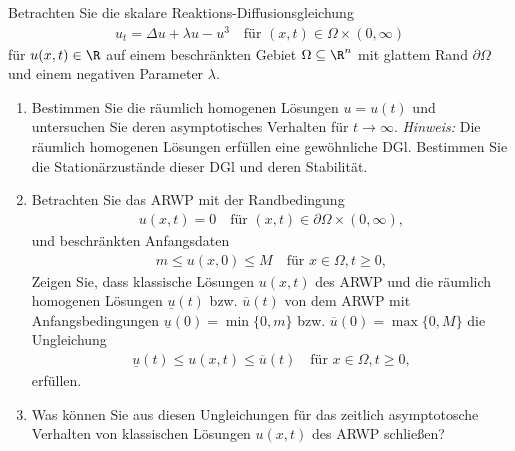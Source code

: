 
\begin{exercise}

\phantom{}
	Betrachten Sie die skalare Reaktions-Diffusionsgleichung
	\begin{align*}
		u_t = \Delta u + \lambda u - u^3 \quad \text{für } (x,t) \in \Omega \times (0, \infty)
	\end{align*}
	für $u(x,t) \in \R$ auf einem beschränkten Gebiet $\Omega \subseteq \R^n$ mit glattem Rand $\partial \Omega$ und einem negativen Parameter $\lambda$. 
	\begin{enumerate}[label = (\roman*)]
		\item Bestimmen Sie die räumlich homogenen Lösungen $u = u(t)$ und untersuchen Sie deren asymptotisches Verhalten für $t \to \infty$. \newline
		\textit{Hinweis:} Die räumlich homogenen Lösungen erfüllen eine gewöhnliche DGl. Bestimmen Sie die Stationärzustände dieser DGl und deren Stabilität. 
		
		\item Betrachten Sie das ARWP mit der Randbedingung 
		\begin{align*}
			u(x,t) = 0 \quad \text{für } (x,t) \in \partial \Omega \times (0, \infty),
		\end{align*}
		und beschränkten Anfangsdaten
		\begin{align*}
			m \leq u(x,0) \leq M \quad \text{für }  x \in \Omega, t \geq 0,
		\end{align*}
		Zeigen Sie, dass klassische Lösungen $u(x,t)$ des ARWP und die räumlich homogenen Lösungen $\underline{u}(t)$ bzw. $\overline{u}(t)$ von dem ARWP mit Anfangsbedingungen $\underline{u}(0) = \min\{0, m\}$ bzw. $\overline{u}(0) = \max\{0, M\}$ die Ungleichung
		\begin{align*}
			\underline{u}(t) \leq u(x,t) \leq \overline{u}(t) \quad \text{für } x \in \Omega, t \geq 0,
		\end{align*}
		erfüllen.
		
		\item Was können Sie aus diesen Ungleichungen für das zeitlich asymptotosche Verhalten von klassischen Lösungen $u(x,t)$ des ARWP schließen?
	\end{enumerate} 
\end{exercise}


